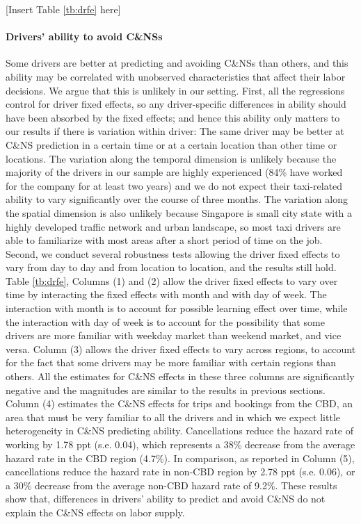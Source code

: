 \documentclass[reviewmode]{restud}
\begin{document}
\begin{center}
    [Insert Table \ref{tb:drfe} here]
\end{center}

\paragraph{Drivers' ability to avoid C\&NSs} Some drivers are better at predicting and avoiding C\&NSs than others, and this ability may be correlated with unobserved characteristics that affect their labor decisions. We argue that this is unlikely in our setting. First, all the regressions control for driver fixed effects, so any driver-specific differences in ability should have been absorbed by the fixed effects; and hence this ability only matters to our results if there is variation within driver: The same driver may be better at C\&NS prediction in a certain time or at a certain location than other time or locations. The variation along the temporal dimension is unlikely because the majority of the drivers in our sample are highly experienced (84\% have worked for the company for at least two years) and we do not expect their taxi-related ability to vary significantly over the course of three months. The variation along the spatial dimension is also unlikely because Singapore is small city state with a highly developed traffic network and urban landscape, so most taxi drivers are able to familiarize with most areas after a short period of time on the job. Second, we conduct several robustness tests allowing the driver fixed effects to vary from day to day and from location to location, and the results still hold. Table \ref{tb:drfe}, Columns (1) and (2)  allow the driver fixed effects to vary over time by interacting the fixed effects with month and with day of week. The interaction with month is to account for possible learning effect over time, while the interaction with day of week is to account for the possibility that some drivers are more familiar with weekday market than weekend market, and vice versa. Column (3) allows the driver fixed effects to vary across regions, to account for the fact that some drivers may be more familiar with certain regions than others. All the estimates for C\&NS effects in these three columns are significantly negative and the magnitudes are similar to the results in previous sections. Column (4) estimates the C\&NS effects for trips and bookings from the CBD, an area that must be very familiar to all the drivers and in which we expect little heterogeneity in C\&NS predicting ability. Cancellations reduce the hazard rate of working by 1.78 ppt (s.e. 0.04), which represents a 38\% decrease from the average hazard rate in the CBD region (4.7\%). In comparison, as reported in Column (5), cancellations reduce the hazard rate in non-CBD region by 2.78 ppt (s.e. 0.06), or a 30\% decrease from the average non-CBD hazard rate of 9.2\%. These results show that, differences in drivers' ability to predict and avoid C\&NS do not explain the C\&NS effects on labor supply.
\end{document}
